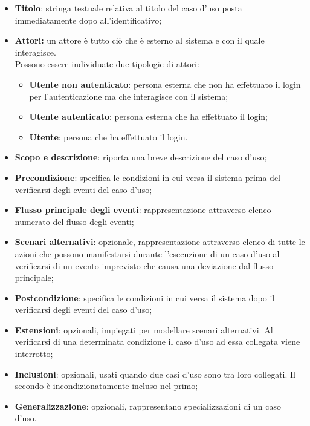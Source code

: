                 \begin{itemize}
                    \item\textbf{Titolo}: stringa testuale relativa al titolo del caso d’uso posta immediatamente dopo all’identificativo;
                    \item\textbf{Attori:} un attore è tutto ciò che è esterno al sistema e con il quale interagisce. \\
                        Possono essere individuate due tipologie di attori:
                        \begin{itemize}
                            \item\textbf{Utente non autenticato}: persona esterna che non ha effettuato il login per l’autenticazione ma che interagisce con il sistema;
                            \item\textbf{Utente autenticato}: persona esterna che ha effettuato il login;
                            \item\textbf{Utente}: persona che ha effettuato il login.
                        \end{itemize}
                    \item\textbf{Scopo e descrizione}: riporta una breve descrizione del caso d’uso;
                    \item\textbf{Precondizione}: specifica le condizioni in cui versa il sistema prima del verificarsi degli eventi del caso d’uso;
                    \item\textbf{Flusso principale degli eventi}: rappresentazione attraverso elenco numerato del flusso degli eventi;
                    \item\textbf{Scenari alternativi}: opzionale, rappresentazione attraverso elenco di tutte le azioni che possono manifestarsi durante l’esecuzione di un caso d’uso al verificarsi di un evento imprevisto che causa una deviazione dal flusso principale;
                    \item\textbf{Postcondizione}: specifica le condizioni in cui versa il sistema dopo il verificarsi degli eventi del caso d’uso;
                    \item\textbf{Estensioni}: opzionali, impiegati per modellare scenari alternativi. Al verificarsi di una determinata condizione il caso d’uso ad essa collegata viene interrotto;
                    \item\textbf{Inclusioni}: opzionali, usati quando due casi d’uso sono tra loro collegati. Il secondo è incondizionatamente incluso nel primo;
                    \item\textbf{Generalizzazione}: opzionali, rappresentano specializzazioni di un caso d’uso.
                \end{itemize}
